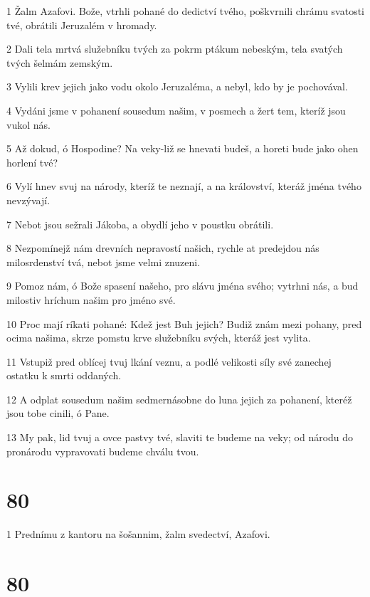\par 1 Žalm Azafovi. Bože, vtrhli pohané do dedictví tvého, poškvrnili chrámu svatosti tvé, obrátili Jeruzalém v hromady.
\par 2 Dali tela mrtvá služebníku tvých za pokrm ptákum nebeským, tela svatých tvých šelmám zemským.
\par 3 Vylili krev jejich jako vodu okolo Jeruzaléma, a nebyl, kdo by je pochovával.
\par 4 Vydáni jsme v pohanení sousedum našim, v posmech a žert tem, kteríž jsou vukol nás.
\par 5 Až dokud, ó Hospodine? Na veky-liž se hnevati budeš, a horeti bude jako ohen horlení tvé?
\par 6 Vylí hnev svuj na národy, kteríž te neznají, a na království, kteráž jména tvého nevzývají.
\par 7 Nebot jsou sežrali Jákoba, a obydlí jeho v poustku obrátili.
\par 8 Nezpomínejž nám drevních nepravostí našich, rychle at predejdou nás milosrdenství tvá, nebot jsme velmi znuzeni.
\par 9 Pomoz nám, ó Bože spasení našeho, pro slávu jména svého; vytrhni nás, a bud milostiv hríchum našim pro jméno své.
\par 10 Proc mají ríkati pohané: Kdež jest Buh jejich? Budiž znám mezi pohany, pred ocima našima, skrze pomstu krve služebníku svých, kteráž jest vylita.
\par 11 Vstupiž pred oblícej tvuj lkání veznu, a podlé velikosti síly své zanechej ostatku k smrti oddaných.
\par 12 A odplat sousedum našim sedmernásobne do luna jejich za pohanení, kteréž jsou tobe cinili, ó Pane.
\par 13 My pak, lid tvuj a ovce pastvy tvé, slaviti te budeme na veky; od národu do pronárodu vypravovati budeme chválu tvou.

\chapter{80}

\par 1 Prednímu z kantoru na šošannim, žalm svedectví, Azafovi.

\chapter{80}


